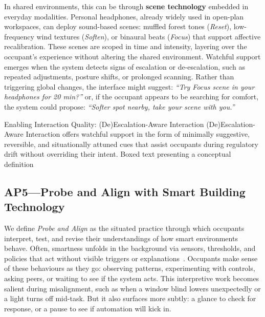In shared environments, this can be through \textbf{scene technology} embedded in everyday modalities. Personal headphones, already widely used in open-plan workspaces, can deploy sound-based scenes: muffled forest tones (\textit{Reset}), low-frequency wind textures (\textit{Soften}), or binaural beats (\textit{Focus}) that support affective recalibration. These scenes are scoped in time and intensity, layering over the occupant’s experience without altering the shared environment. Watchful support emerges when the system detects signs of escalation or de-escalation, such as repeated adjustments, posture shifts, or prolonged scanning. Rather than triggering global changes, the interface might suggest: \textit{``Try Focus scene in your headphones for 20 min?''}  or, if the occupant appears to be searching for comfort, the system could propose: \textit{``Softer spot nearby, take your scene with you.''}  


\designbox
{Enabling Interaction Quality: (De)Escalation-Aware Interaction}
{(De)Escalation-Aware Interaction offers watchful support in the form of minimally suggestive, reversible, and situationally attuned cues that assist occupants during regulatory drift without overriding their intent.}
{Boxed text presenting a conceptual definition}


\subsection{AP5---Probe and Align with Smart Building Technology}
We define \textit{Probe and Align} as the situated practice through which occupants interpret, test, and revise their understandings of how smart environments behave. Often, smartness unfolds in the background via sensors, thresholds, and policies that act without visible triggers or explanations~\cite{saputra2023smart, daissaoui2020iot}. Occupants make sense of these behaviours as they go: observing patterns, experimenting with controls, asking peers, or waiting to see if the system acts. This interpretive work becomes salient during misalignment, such as when a window blind lowers unexpectedly or a light turns off mid-task. But it also surfaces more subtly: a glance to check for response, or a pause to see if automation will kick in. 

